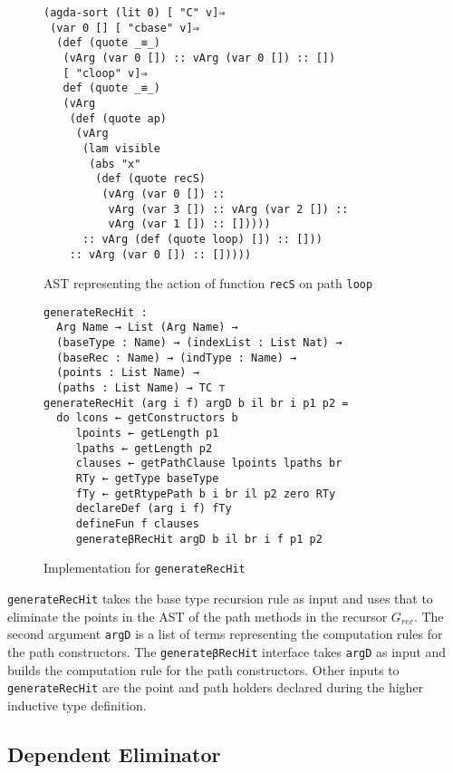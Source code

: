 \documentclass[sigplan,10pt]{acmart}
\begin{document}
\begin{figure}
\begin{center}
\begingroup
\fontsize{7pt}{9pt}\selectfont
\begin{Verbatim}
(agda-sort (lit 0) [ "C" v]⇒
 (var 0 [] [ "cbase" v]⇒
  (def (quote _≡_)
   (vArg (var 0 []) :: vArg (var 0 []) :: [])
   [ "cloop" v]⇒
   def (quote _≡_)
   (vArg
    (def (quote ap)
     (vArg
      (lam visible
       (abs "x"
        (def (quote recS)
         (vArg (var 0 []) ::
          vArg (var 3 []) :: vArg (var 2 []) :: 
          vArg (var 1 []) :: []))))
      :: vArg (def (quote loop) []) :: []))
    :: vArg (var 0 []) :: []))))
\end{Verbatim}
\endgroup
\end{center}
\caption{AST representing the action of function {\tt recS} on path {\tt loop}}
\label{fig:ast-beta-f}
\end{figure}
\normalsize

\begin{figure}
\begin{center}
\begingroup
\fontsize{7pt}{9pt}\selectfont
\begin{Verbatim}
generateRecHit : 
  Arg Name → List (Arg Name) →
  (baseType : Name) → (indexList : List Nat) →
  (baseRec : Name) → (indType : Name) →
  (points : List Name) → 
  (paths : List Name) → TC ⊤
generateRecHit (arg i f) argD b il br i p1 p2 =
  do lcons ← getConstructors b
     lpoints ← getLength p1
     lpaths ← getLength p2
     clauses ← getPathClause lpoints lpaths br
     RTy ← getType baseType
     fTy ← getRtypePath b i br il p2 zero RTy
     declareDef (arg i f) fTy
     defineFun f clauses
     generateβRecHit argD b il br i f p1 p2
\end{Verbatim}
\endgroup
\end{center}
\caption{Implementation for {\tt generateRecHit}}
\label{fig:generateRecHit}
\end{figure}
\normalsize

{\tt generateRecHit} takes the base type recursion rule as input and uses that to eliminate the points in the AST of the path methods in the recursor $G_{rec}$. The second argument {\tt argD} is a list of terms representing the computation rules for the path constructors. The {\tt generateβRecHit} interface takes {\tt argD} as input and builds the computation rule for the path constructors. Other inputs to {\tt generateRecHit} are the point and path holders declared during the higher inductive type definition.

\subsection{Dependent Eliminator}
\label{sec:sec4.3}
\end{document}
